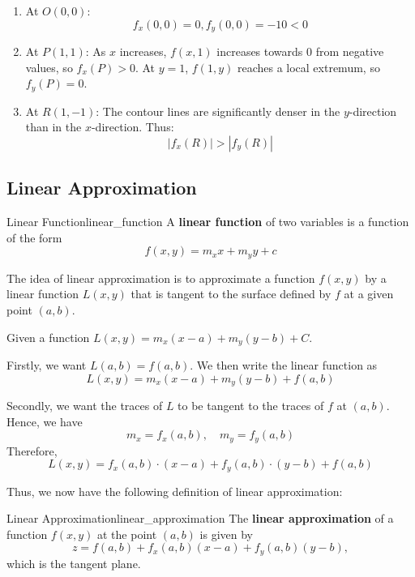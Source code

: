 \begin{sol}
\begin{enumerate}
    \item At $O(0,0)$:
    \[ f_x(0,0) = 0 , f_y(0,0) = -10 < 0 \]
    
    \item At $P(1,1)$:
    As $x$ increases, $f(x,1)$ increases towards $0$ from negative values, so $f_x(P) > 0$.
    At $y = 1$, $f(1,y)$ reaches a local extremum, so $f_y(P) = 0$.
    
    \item At $R(1,-1)$:
    The contour lines are significantly denser in the $y$-direction than in the $x$-direction. Thus:
    \[ |f_x(R)| > |f_y(R)| \]
\end{enumerate}
\end{sol}

\subsection{Linear Approximation}

\begin{definition}{Linear Function}{linear_function}
A \textbf{linear function} of two variables is a function of the form
\[
    f(x, y) = m_x x + m_y y + c
\]
\end{definition}

The idea of linear approximation is to approximate a function $f(x, y)$ by a linear function $L(x, y)$ that is tangent to the surface defined by $f$ at a given point $(a, b)$.

Given a function $L(x, y) = m_x (x - a) + m_y (y - b) + C$.

Firstly, we want $L(a, b) = f(a, b)$.
We then write the linear function as
\[
    L(x, y) = m_x (x - a) + m_y (y - b) + f(a, b)
\]

Secondly, we want the traces of $L$ to be tangent to the traces of $f$ at $(a, b)$.
Hence, we have
\[
    m_x = f_x(a, b), \quad m_y = f_y(a, b)
\]
Therefore,
\[
    L(x, y) = f_x(a, b)\cdot(x - a) + f_y(a, b)\cdot(y - b) + f(a, b)
\]

Thus, we now have the following definition of linear approximation:
\begin{definition}{Linear Approximation}{linear_approximation}
The \textbf{linear approximation} of a function $f(x, y)$ at the point $(a, b)$ is given by
\[
    z = f(a, b) + f_x(a, b)(x - a) + f_y(a, b)(y - b),
\]
which is the tangent plane.
\end{definition}

